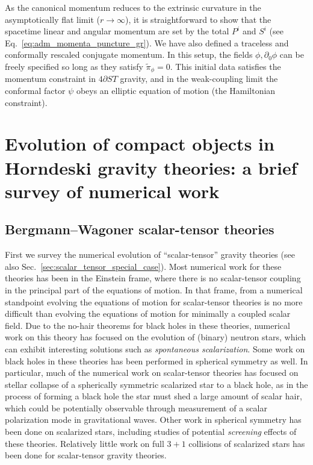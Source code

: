 \documentclass{ws-ijmpd}
\begin{document}
As the canonical momentum reduces to the extrinsic curvature in the
asymptotically flat limit ($r\to\infty$), it is straightforward to
show that the spacetime linear and angular momentum are set by
the total $P^i$ and $S^i$ 
(see Eq.~\eqref{eq:adm_momenta_puncture_gr})\cite{Kovacs:2021lgk}.
We have also defined a traceless and conformally rescaled
conjugate momentum.
In this setup, 
the fields $\phi,\partial_0\phi$ can be freely specified so long
as they satisfy $\tilde{\pi}_{\phi}=0$.
This initial data satisfies the momentum constraint in 
$4\partial ST$ gravity, and in the weak-coupling limit
the conformal factor $\psi$ obeys an elliptic equation of motion
(the Hamiltonian constraint).


\section{Evolution of compact objects in 
Horndeski gravity theories: a brief survey of numerical work
\label{sec:general_survey_numerical_work}}

\subsection{Bergmann--Wagoner scalar-tensor theories
\label{sec:scalar_tensor_special_case_numerical}}
   First we survey the numerical evolution of ``scalar-tensor'' gravity
theories (see also Sec.~\ref{sec:scalar_tensor_special_case}).
Most numerical work for these theories
has been in the Einstein frame,
where there is no scalar-tensor coupling in the principal part
of the equations of motion.
In that frame, from a numerical standpoint evolving the equations
of motion for scalar-tensor theories is no more difficult than
evolving the equations of motion for minimally a coupled scalar field.
Due to the no-hair theorems for black holes in these 
theories\cite{Hawking:1972qk,Herdeiro:2015waa},
numerical work on this theory has focused on the evolution
of (binary) neutron stars, which can exhibit interesting solutions such as 
\emph{spontaneous scalarization}\cite{Damour:1996ke}.
Some work on black holes in these theories
has been performed in spherical symmetry as 
well\cite{Scheel:1994yr,Scheel:1994yn}.
In particular, much of the numerical work on scalar-tensor
theories has focused on stellar collapse of
a spherically symmetric scalarized star to a black hole, as in the process
of forming a black hole the star must shed a large amount
of scalar hair, which could be potentially observable
through measurement of a scalar polarization mode in gravitational 
waves\cite{Novak:1999jg,
Gerosa:2016fri,
Sperhake:2017itk,
Cheong:2018gzn,
Rosca-Mead:2019seq,Rosca-Mead:2020ehn,Geng:2020slq,
Huang:2021tpu,Kuan:2021yih,
Kuan:2022oxs}.
Other work in spherical symmetry has been done on scalarized
stars\cite{Mendes:2021fon}, including studies
of potential \emph{screening} 
effects\cite{Khoury:2003aq,Khoury:2003rn,Joyce:2014kja,Quiros:2019ktw} 
of these theories\cite{Dima:2021pwx}. 
Relatively little work on full $3+1$ collisions 
of scalarized stars has been done for scalar-tensor gravity theories.
\end{document}
